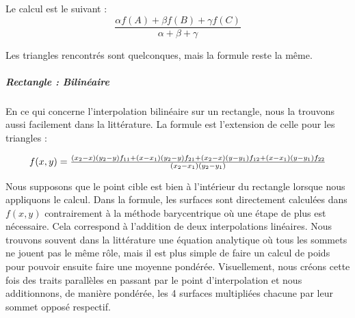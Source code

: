 Le calcul est le suivant :
\begin{equation}
    \frac{\alpha f(A) + \beta f(B) + \gamma f(C)}{\alpha + \beta + \gamma}
\end{equation}


\vspace{0.1cm}

Les triangles rencontrés sont quelconques, mais la formule reste la même.

\subparagraph{Rectangle : Bilinéaire}

En ce qui concerne l'interpolation bilinéaire sur un rectangle, nous la trouvons aussi facilement dans la littérature. La formule est l'extension de celle pour les triangles :

\vspace{-0.4cm}

\begin{equation}
    \resizebox{0.9\hsize}{!}{$
    f(x, y) = \frac{(x_2 - x)(y_2 - y)f_{11} + (x - x_1)(y_2 - y)f_{21} + (x_2 - x)(y - y_1)f_{12} + (x - x_1)(y - y_1)f_{22}}{(x_2 - x_1)(y_2 - y_1)}
    $}
\end{equation}
                
Nous supposons que le point cible est bien à l'intérieur du rectangle lorsque nous appliquons le calcul.
Dans la formule, les surfaces sont directement calculées dans \(f(x, y)\) contrairement à la méthode barycentrique où une étape de plus est nécessaire.
Cela correspond à l'addition de deux interpolations linéaires. Nous trouvons souvent dans la littérature une équation analytique où tous les sommets ne jouent pas le même rôle, mais il est plus simple de faire un calcul de poids pour pouvoir ensuite faire une moyenne pondérée. 
Visuellement, nous créons cette fois des traits parallèles en passant par le point d'interpolation et nous additionnons, de manière pondérée, les 4 surfaces multipliées chacune par leur sommet opposé respectif.

